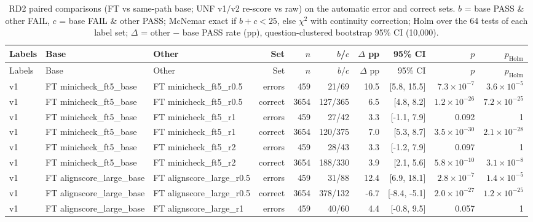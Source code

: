\begin{scriptsize}
\begin{longtable}{lllrrrrrrr}
\caption{RD2 paired comparisons (FT vs same-path base; UNF v1/v2 re-score vs raw) on the automatic error and correct sets. $b$ = base PASS \& other FAIL, $c$ = base FAIL \& other PASS; McNemar exact if $b+c<25$, else $\chi^2$ with continuity correction; Holm over the 64 tests of each label set; $\Delta$ = other $-$ base PASS rate (pp), question-clustered bootstrap 95\% CI (10{,}000).}\label{tab:rd2paired}\\
\toprule
Labels & Base & Other & Set & $n$ & $b$/$c$ & $\Delta$ pp & 95\% CI & $p$ & $p_\mathrm{Holm}$ \\
\midrule
\endfirsthead
\toprule
Labels & Base & Other & Set & $n$ & $b$/$c$ & $\Delta$ pp & 95\% CI & $p$ & $p_\mathrm{Holm}$ \\
\midrule
\endhead
\bottomrule
\endfoot
v1 & FT minicheck\_ft5\_base & FT minicheck\_ft5\_r0.5 & errors & 459 & 21/69 & 10.5 & [5.8, 15.5] & $7.3\times10^{-7}$ & $3.6\times10^{-5}$ \\
v1 & FT minicheck\_ft5\_base & FT minicheck\_ft5\_r0.5 & correct & 3654 & 127/365 & 6.5 & [4.8, 8.2] & $1.2\times10^{-26}$ & $7.2\times10^{-25}$ \\
v1 & FT minicheck\_ft5\_base & FT minicheck\_ft5\_r1 & errors & 459 & 27/42 & 3.3 & [-1.1, 7.9] & 0.092 & 1 \\
v1 & FT minicheck\_ft5\_base & FT minicheck\_ft5\_r1 & correct & 3654 & 120/375 & 7.0 & [5.3, 8.7] & $3.5\times10^{-30}$ & $2.1\times10^{-28}$ \\
v1 & FT minicheck\_ft5\_base & FT minicheck\_ft5\_r2 & errors & 459 & 28/43 & 3.3 & [-1.2, 7.9] & 0.097 & 1 \\
v1 & FT minicheck\_ft5\_base & FT minicheck\_ft5\_r2 & correct & 3654 & 188/330 & 3.9 & [2.1, 5.6] & $5.8\times10^{-10}$ & $3.1\times10^{-8}$ \\
v1 & FT alignscore\_large\_base & FT alignscore\_large\_r0.5 & errors & 459 & 31/88 & 12.4 & [6.9, 18.1] & $2.8\times10^{-7}$ & $1.4\times10^{-5}$ \\
v1 & FT alignscore\_large\_base & FT alignscore\_large\_r0.5 & correct & 3654 & 378/132 & -6.7 & [-8.4, -5.1] & $2.0\times10^{-27}$ & $1.2\times10^{-25}$ \\
v1 & FT alignscore\_large\_base & FT alignscore\_large\_r1 & errors & 459 & 40/60 & 4.4 & [-0.8, 9.5] & 0.057 & 1 \\

\end{longtable}
\end{scriptsize}
